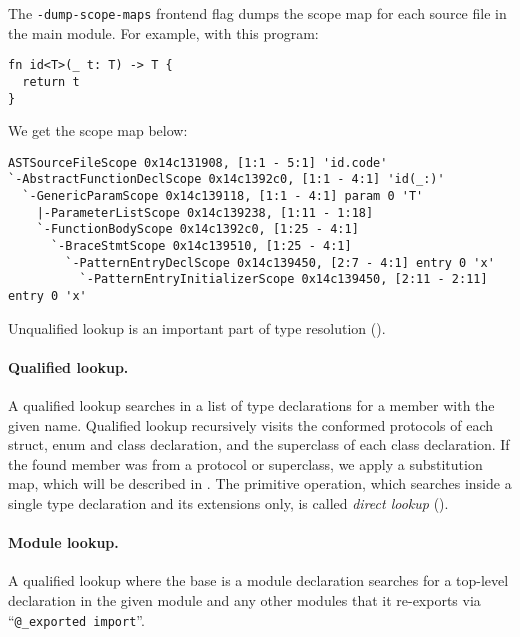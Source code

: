 \documentclass[../generics]{subfiles}
\begin{document}
The \texttt{-dump-scope-maps} frontend flag dumps the scope map for each source file in the main module. For example, with this program:
\begin{Verbatim}
fn id<T>(_ t: T) -> T {
  return t
}
\end{Verbatim}
We get the scope map below:
\begin{Verbatim}[fontsize=\scriptsize,numbers=none]
ASTSourceFileScope 0x14c131908, [1:1 - 5:1] 'id.code'
`-AbstractFunctionDeclScope 0x14c1392c0, [1:1 - 4:1] 'id(_:)'
  `-GenericParamScope 0x14c139118, [1:1 - 4:1] param 0 'T'
    |-ParameterListScope 0x14c139238, [1:11 - 1:18] 
    `-FunctionBodyScope 0x14c1392c0, [1:25 - 4:1] 
      `-BraceStmtScope 0x14c139510, [1:25 - 4:1] 
        `-PatternEntryDeclScope 0x14c139450, [2:7 - 4:1] entry 0 'x'
          `-PatternEntryInitializerScope 0x14c139450, [2:11 - 2:11] entry 0 'x'
\end{Verbatim}

Unqualified lookup is an important part of type resolution ().

\paragraph{Qualified lookup.}
A qualified lookup searches in a list of type declarations for a member with the given name. Qualified lookup recursively visits the conformed protocols of each struct, enum and class declaration, and the superclass of each class declaration. If the found member was from a protocol or superclass, we apply a substitution map, which will be described in . The primitive operation, which searches inside a single type declaration and its extensions only, is called \emph{direct lookup}  ().

\paragraph{Module lookup.} A qualified lookup where the base is a module declaration searches for a top-level declaration in the given module and any other modules that it re-exports via ``\verb|@_exported import|''.
\end{document}
